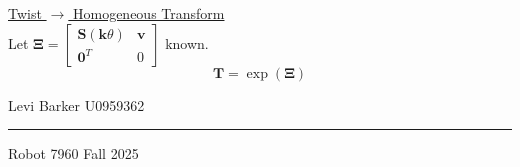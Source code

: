\documentclass[twocolumn]{article}    %
\begin{document}
\noindent\underline{Twist \(\longrightarrow\) Homogeneous Transform}\\
Let \(\bm{\Xi} = \begin{bmatrix}
    \bm{S}(\bm{k}\theta) & \bm{v} \\ \bm{0}^T & 0 
\end{bmatrix}\) known.\\
\begin{equation*}
    \bm{T} = \operatorname{exp}(\bm{\Xi})
\end{equation*}

\vfill
\begin{center}    
    Levi Barker \hspace{82pt} U0959362 \\ \vspace{2pt}
    \hrule
    \vspace{2pt}
    Robot 7960 \hspace{85pt} Fall 2025
\end{center}
\end{document}
